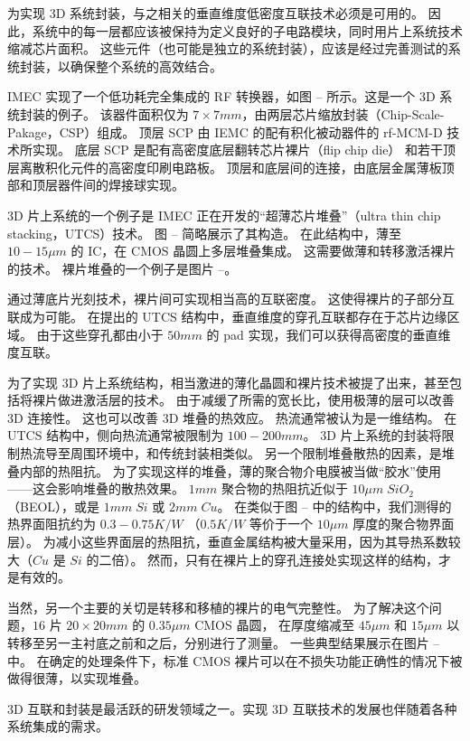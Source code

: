 为实现 3D 系统封装，与之相关的垂直维度低密度互联技术必须是可用的。
因此，系统中的每一层都应该被保持为定义良好的子电路模块，同时用片上系统技术缩减芯片面积。
这些元件（也可能是独立的系统封装），应该是经过完善测试的系统封装，以确保整个系统的高效结合。

IMEC 实现了一个低功耗完全集成的 RF 转换器，如图 -- 所示。这是一个 3D 系统封装的例子。
该器件面积仅为 $7 \times 7 mm$，由两层芯片缩放封装（Chip-Scale-Pakage，CSP）组成。
顶层 SCP 由 IEMC 的配有积化被动器件的 rf-MCM-D 技术所实现。
底层 SCP 是配有高密度底层翻转芯片裸片（flip chip die） 和若干顶层离散积化元件的高密度印刷电路板。
顶层和底层间的连接，由底层金属薄板顶部和顶层器件间的焊接球实现。

3D 片上系统的一个例子是 IMEC 正在开发的“超薄芯片堆叠”（ultra thin chip stacking，UTCS）技术。
图 -- 简略展示了其构造。
在此结构中，薄至 $10-15\mu m$ 的 IC，在 CMOS 晶圆上多层堆叠集成。
这需要做薄和转移激活裸片的技术。
裸片堆叠的一个例子是图片 --。

通过薄底片光刻技术，裸片间可实现相当高的互联密度。
这使得裸片的子部分互联成为可能。
在提出的 UTCS 结构中，垂直维度的穿孔互联都存在于芯片边缘区域。
由于这些穿孔都由小于 $50mm$ 的 pad 实现，我们可以获得高密度的垂直维度互联。

为了实现 3D 片上系统结构，相当激进的薄化晶圆和裸片技术被提了出来，甚至包括将裸片做进激活层的技术。
由于减缓了所需的宽长比，使用极薄的层可以改善 3D 连接性。
这也可以改善 3D 堆叠的热效应。
热流通常被认为是一维结构。
在 UTCS 结构中，侧向热流通常被限制为 $100-200 mm$。
3D 片上系统的封装将限制热流导至周围环境中，和传统封装相类似。
另一个限制堆叠散热的因素，是堆叠内部的热阻抗。
为了实现这样的堆叠，薄的聚合物介电膜被当做“胶水”使用——这会影响堆叠的散热效果。
$1mm$ 聚合物的热阻抗近似于 $10 \mu m \; SiO_2$（BEOL），或是 $1mm \; Si$ 或 $2mm \; Cu$。
在类似于图 -- 中的结构中，我们测得的热界面阻抗约为 $0.3-0.75K/W$
（$0.5K/W$ 等价于一个 $10 \mu m$ 厚度的聚合物界面层）。
为减小这些界面层的热阻抗，垂直金属结构被大量采用，因为其导热系数较大（$Cu$ 是 $Si$ 的二倍）。
然而，只有在裸片上的穿孔连接处实现这样的结构，才是有效的。

当然，另一个主要的关切是转移和移植的裸片的电气完整性。
为了解决这个问题，$16$ 片 $20 \times 20 mm$ 的 $0.35 \mu m$ CMOS 晶圆，
在厚度缩减至 $45\mu m$ 和 $15 \mu m$ 以转移至另一主衬底之前和之后，分别进行了测量。
一些典型结果展示在图片 -- 中。
在确定的处理条件下，标准 CMOS 裸片可以在不损失功能正确性的情况下被做得很薄，以实现堆叠。

3D 互联和封装是最活跃的研发领域之一。实现 3D 互联技术的发展也伴随着各种系统集成的需求。
